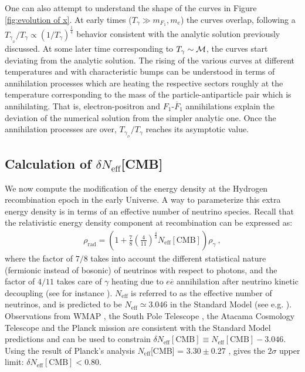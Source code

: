 \documentclass[12pt]{article}
\begin{document}
One can also attempt to understand the shape of the curves in Figure
\ref{fig:evolution of x}. At early times ($T _{\gamma} \gg m _{F_1},m
_e$) the curves overlap, following a $T _{\gamma _{_D}}/T _{\gamma}
\propto \left (1/T _{\gamma} \right ) ^{\frac{1}{4}}$ behavior
consistent with the analytic solution previously discussed. At some
later time corresponding to $T _{\gamma} \sim {\cal M}$, the curves
start deviating from the analytic solution. The rising of the various
curves at different temperatures and with characteristic bumps can be
understood in terms of annihilation processes which are heating the
respective sectors roughly at the temperature corresponding to the mass
of the particle-antiparticle pair which is annihilating. That is,
electron-positron and $F _1$-$\overline{F} _1$ annihilations explain the
deviation of the numerical solution from the simpler analytic one. Once
the annihilation processes are over, $T _{\gamma _{_D}}/T _{\gamma}$
reaches its asymptotic value.

\vskip 3.4cm
\subsection{Calculation of $\delta N _{\text{eff}}$[CMB]}
\vskip 0.2cm

We now compute the modification of the energy density at the Hydrogen
recombination epoch in the early Universe. A way to parameterize this
extra energy density is in terms of an effective number of neutrino
species. Recall that the relativistic energy density component at
recombination can be expressed as:
%
\begin{eqnarray}
\rho _{\text{rad}} = \left (1 + \frac{7}{8} \left (\frac{4}{11} \right)
^{\frac{4}{3}} N _{\text{eff}}[\text{CMB}] \right ) \rho _{\gamma} \ ,
\end{eqnarray}
%
where the factor of $7/8$ takes into account the different statistical
nature (fermionic instead of bosonic) of neutrinos with respect to
photons, and the
factor of $4/11$ takes care of $\gamma$ heating due to $e \overline{e}$
annihilation after neutrino kinetic decoupling (see for instance
\cite{earlyuniverse}). $N _{\text{eff}}$ is referred to as the effective
number of neutrinos, and is predicted to be $N _{\text{eff}} \simeq
3.046$ in the
Standard Model (see e.g. \cite{mangano}). 
Observations from WMAP \cite{wmapx}, the South Pole Telescope
\cite{sptx}, the Atacama Cosmology Telescope
\cite{atax} and the Planck mission \cite{plax} are consistent with the
Standard Model predictions and can be used to constrain 
$\delta N_{\text{eff}}[\text{CMB}] \equiv N _{\text{eff}}[\text{CMB}] -
3.046$. 
Using the result of 
Planck's analysis $N_{\text{eff}}$[CMB] = $3.30 \pm 0.27$ \cite{plax},
gives the  
$2\sigma$ upper limit: $\delta N _{\text{eff}}[\text{CMB}] < 0.80$. 
\end{document}
